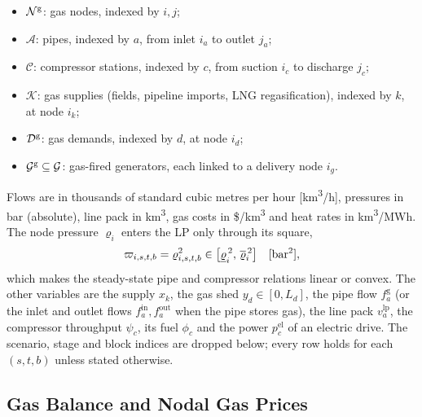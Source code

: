 \begin{itemize}
  \item $\mathcal{N}^{\mathrm{g}}$: gas nodes, indexed by $i, j$;
  \item $\mathcal{A}$: pipes, indexed by $a$, from inlet $i_a$ to
        outlet $j_a$;
  \item $\mathcal{C}$: compressor stations, indexed by $c$, from
        suction $i_c$ to discharge $j_c$;
  \item $\mathcal{K}$: gas supplies (fields, pipeline imports, LNG
        regasification), indexed by $k$, at node $i_k$;
  \item $\mathcal{D}^{\mathrm{g}}$: gas demands, indexed by $d$, at node $i_d$;
  \item $\mathcal{G}^{\mathrm{g}} \subseteq \mathcal{G}$: gas-fired generators,
        each linked to a delivery node $i_g$.
\end{itemize}
Flows are in thousands of standard cubic metres per hour
[km\textsuperscript{3}/h], pressures in bar (absolute), line pack in
km\textsuperscript{3}, gas costs in \$/km\textsuperscript{3} and heat
rates in km\textsuperscript{3}/MWh.  The node pressure $\varrho_i$
enters the LP only through its square,
\begin{equation}
\label{eq:gas_pi}
\varpi_{i,s,t,b} = \varrho_{i,s,t,b}^2
  \in \bigl[\underline{\varrho}_i^{\,2},\, \overline{\varrho}_i^{\,2}\bigr]
  \quad \text{[bar\textsuperscript{2}]},
\end{equation}
which makes the steady-state pipe and compressor relations linear or
convex.  The other variables are the supply $x_k$, the gas shed
$y_d \in [0, L_d]$, the pipe flow $f^{\mathrm{g}}_a$ (or the inlet and
outlet flows $f^{\mathrm{in}}_a, f^{\mathrm{out}}_a$ when the pipe
stores gas), the line pack $v^{\mathrm{lp}}_a$, the compressor
throughput $\psi_c$, its fuel $\phi_c$ and the power $p^{\mathrm{el}}_c$
of an electric drive.  The scenario, stage and block indices are
dropped below; every row holds for each $(s,t,b)$ unless stated
otherwise.

\subsection{Gas Balance and Nodal Gas Prices}


